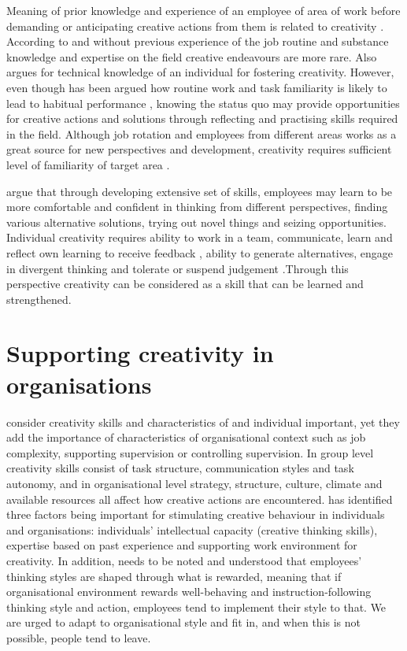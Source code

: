Meaning of prior knowledge and experience of an employee of area of work before demanding or anticipating creative actions from them is related to creativity \citep{mumford1988creativity,redmond1993putting,shalley2004leaders}. According to \citet{mumford1988creativity} and \citet{redmond1993putting} without previous experience of the job routine and substance knowledge and expertise on the field creative endeavours are more rare. Also \citet{jung2003role} argues for technical knowledge of an individual for fostering creativity. However, even though has been argued how routine work and task familiarity is likely to lead to habitual performance \citep{ford1996theory}, knowing the status quo may provide opportunities for creative actions and solutions through reflecting and practising skills required in the field. \citep{shalley2004leaders,andriopoulos2000enhancing} Although job rotation and employees from different areas works as a great source for new perspectives and development, creativity requires sufficient level of familiarity of target area \citep{shalley2004leaders}.

\citet{shalley2004leaders} argue that through developing extensive set of skills, employees may learn to be more comfortable and confident in thinking from different perspectives, finding various alternative solutions, trying out novel things and seizing opportunities. Individual creativity requires ability to work in a team, communicate, learn and reflect own learning \citep{roffe1999innovation} to receive feedback \citep{jung2003role}, ability to generate alternatives, engage in divergent thinking and tolerate or suspend judgement \citep{hennessey19881} .Through this perspective creativity can be considered as a skill that can be learned and strengthened. 

\section{Supporting creativity in organisations}
\citet{oldham1996employee} consider creativity skills and characteristics of and individual important, yet they add the importance of characteristics of organisational context such as job complexity, supporting supervision or controlling supervision. In group level creativity skills consist of task structure, communication styles and task autonomy, and in organisational level strategy, structure, culture, climate and available resources all affect how creative actions are encountered. \citep{jung2003role} \citet{amabile1998kill} has identified three factors being important for stimulating creative behaviour in individuals and organisations: individuals' intellectual capacity (creative thinking skills), expertise based on past experience and supporting work environment for creativity.  In addition, needs to be noted and understood that employees' thinking styles are shaped through what is rewarded, meaning that if organisational environment rewards well-behaving and instruction-following thinking style and action, employees tend to implement their style to that. We are urged to adapt to organisational style and fit in, and when this is not possible, people tend to leave. \citep{sternberg1997creativity}

